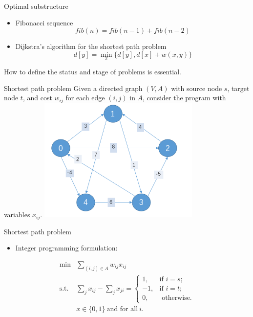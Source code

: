     \begin{frame}{Optimal substructure}
      \begin{itemize}
        \justifying
        \item Fibonacci sequence
        \begin{equation*}
          fib(n) = fib(n-1) + fib(n-2)
        \end{equation*}
        \item Dijkstra's algorithm for the shortest path problem
        \begin{equation*}
          d[y] = \min_x\{d[y], d[x]+w(x,y)\}
        \end{equation*}
      \end{itemize}
      How to define the status and stage of problems is essential.
    \end{frame}

    \begin{frame}{Shortest path problem}
        Given a directed graph $(V, A)$ with source node $s$, target node $t$, and cost $w_{ij}$  for each edge $(i, j)$ in $A$, consider the program with variables $x_{ij}$.
        \centering
        \includegraphics[width = 0.6\textwidth]{images/Shortest1.png}
    \end{frame}

    \begin{frame}{Shortest path problem}
      \begin{itemize}
        \item Integer programming formulation:
      \end{itemize}
      \begin{equation*}
        \begin{align}
        \min& \sum_{(i,j)\in A}w_{ij}x_{ij}\\
        \text{s.t.} &\sum_{j}x_{ij}-\sum_{j}x_{ji}={\begin{cases}1,&{\text{if }}i=s;\\-1,&{\text{if }}i=t;\\0,&{\text{ otherwise.}}\end{cases}}\\
        & x\in \{0,1\} ~\text{and for all} ~i.
        \end{align}
      \end{equation*}
    \end{frame}


